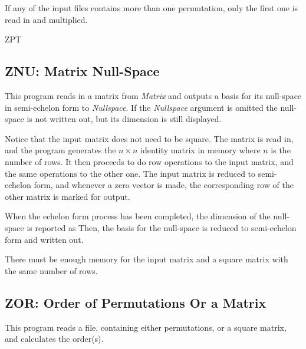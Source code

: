 \Bugs
If any of the input files contains more than one permutation,
only the first one is read in and multiplied.

\SeeAlso
ZPT





\subsection{ZNU: Matrix Null-Space}
\Syntax
{}

\Description
This program reads in a matrix from {\it Matrix} and outputs a basis
for its null-space in semi-echelon form to {\it Nullspace}. If the
{\it Nullspace} argument is omitted the null-space is not written
out, but its dimension is still displayed.

Notice that the input matrix does not need to be square. The
matrix is read in, and the program generates the $n\times n$
identity matrix in memory where $n$ is the number of rows. It then
proceeds to do row operations to the input matrix, and the same
operations to the other one. The input matrix is reduced to
semi-echelon form, and whenever a zero vector is made, the
corresponding row of the other matrix is marked for output.

When the echelon form process has been completed, the dimension
of the null-space is reported as
Then, the basis for the null-space is reduced to semi-echelon
form and written out.

\Limits
There must be enough memory for the input matrix and a square
matrix with the same number of rows.



\subsection{ZOR: Order of Permutations Or a Matrix}
\Syntax
{}

\Description
This program reads a file, containing either permutations, or a
square matrix, and calculates the order(s).


